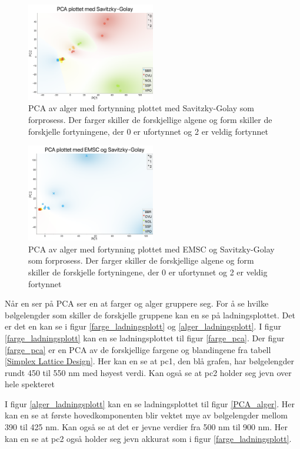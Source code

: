 \documentclass[twocolumn, 11pt]{article} %
\begin{document}
\begin{figure}[H]
\includegraphics[width=0.5\textwidth]{Lab3/Images/PCA_Savitzky.png}
\caption{PCA av alger med fortynning plottet med Savitzky-Golay som forprosess. Der farger skiller de forskjellige algene og form skiller de forskjelle fortyningene, der 0 er ufortynnet og 2 er veldig fortynnet}
\label{PCA_alger_Savi}
\end{figure}

\begin{figure}[H]
\includegraphics[width=0.5\textwidth]{Lab3/Images/PCA_EMSC_Savitzky.png}
\caption{PCA av alger med fortynning plottet med EMSC og Savitzky-Golay som forprosess. Der farger skiller de forskjellige algene og form skiller de forskjelle fortyningene, der 0 er ufortynnet og 2 er veldig fortynnet}
\label{PCA_alger_EMSC_Savi}
\end{figure}


Når en ser på PCA ser en at farger og alger gruppere seg. For å se hvilke bølgelengder som skiller de forskjelle gruppene kan en se på ladningsplottet. Det er det en kan se i figur \ref{farge_ladningsplott} og \ref{alger_ladningsplott}. I figur \ref{farge_ladningsplott} kan en se ladningsplottet til figur \ref{farge_pca}. Der figur \ref{farge_pca} er en PCA av de forskjellige fargene og blandingene fra tabell \ref{Simplex Lattice Design}. Her kan en se at pc1, den blå grafen, har bølgelengder rundt 450 til 550 nm med høyest verdi. Kan også se at pc2 holder seg jevn over hele spekteret 

I figur \ref{alger_ladningsplott} kan en se ladningsplottet til figur \ref{PCA_alger}. Her kan en se at første hovedkomponenten blir vektet mye av bølgelengder mellom 390 til 425 nm. Kan også se at det er jevne verdier fra 500 nm til 900 nm. Her kan en se at pc2 også holder seg jevn akkurat som i figur \ref{farge_ladningsplott}.
\end{document}
